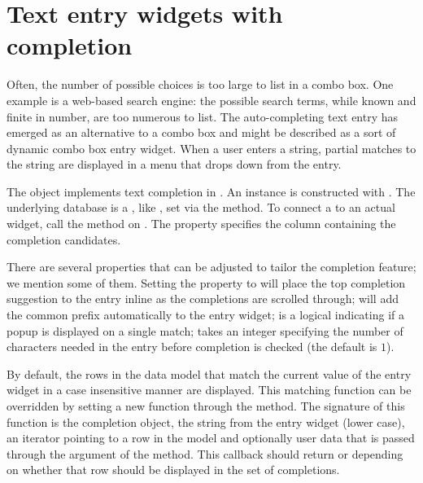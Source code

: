 

\section{Text entry widgets with completion}
\label{sec:RGtk2:entry-completion}

Often, the number of possible choices is too large to list in a combo
box. One example is a web-based search engine: the possible search
terms, while known and finite in number, are too numerous to list. The
auto-completing text entry has emerged as an alternative to a combo
box and might be described as a sort of dynamic combo box entry widget. 
When a user enters a string, partial matches to the string are
displayed in a menu that drops down from the entry. 

The  object implements text completion in
\GTK. An instance is constructed with
. The underlying database is a
, like , set via the
 method. To connect a
 to an actual  widget, call
the  method on .  The
 property specifies the column containing the
completion candidates. 

There are several properties that can be adjusted to tailor the
completion feature; we mention some of them. Setting the property
 to  will place the top completion
suggestion to the entry inline as the completions are scrolled
through;  will add the common prefix
automatically to the entry widget;  is a
logical indicating if a popup is displayed on a single match;
 takes an integer specifying the number of
characters needed in the entry before completion is checked (the
default is $1$).

By default, the rows in the data model that match the current value of
the entry widget in a case insensitive manner are displayed. This
matching function can be overridden by setting a new \R\/ function through
the  method. The signature of
this function is the completion object, the string from the entry
widget (lower case), an iterator pointing to a row in the model and
optionally user data that is passed through the 
argument of the  method. This callback should
return  or  depending on whether that row
should be displayed in the set of completions.

